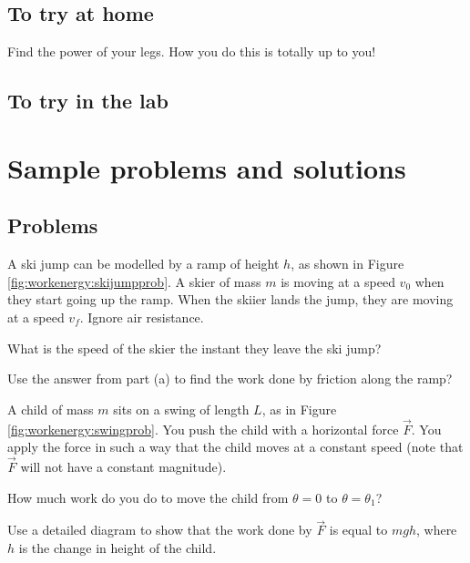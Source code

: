\subsection{To try at home}

\begin{tQuestion}Find the power of your legs. How you do this is totally up to you! \end{tQuestion}

\subsection{To try in the lab}

\newpage
\section{Sample problems and solutions}
\subsection{Problems}
\begin{problemParts}{\label{prob:workenergy:skijump} A ski jump can be modelled by a ramp of height $h$, as shown in Figure \ref{fig:workenergy:skijumpprob}. A skier of mass $m$ is moving at a speed $v_0$ when they start going up the ramp. When the skiier lands the jump, they are moving at a speed $v_f$. Ignore air resistance. 
}
\item What is the speed of the skier the instant they leave the ski jump?
\item Use the answer from part (a) to find the work done by friction along the ramp?
\end{problemParts}

\begin{problemParts}{\label{prob:workenergy:swingwork}
A child of mass $m$ sits on a swing of length $L$, as in Figure \ref{fig:workenergy:swingprob}. You push the child with a horizontal force $\vec F$. You apply the force in such a way that the child moves at a constant speed (note that $\vec F$ will not have a constant magnitude).}
\item How much work do you do to move the child from $\theta=0$ to $\theta=\theta_1$? 
\item Use a detailed diagram to show that the work done by $\vec F$ is equal to $mgh$, where $h$ is the change in height of the child. 
\end{problemParts}

